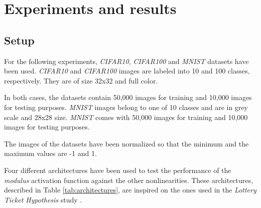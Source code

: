 \begin{itemize}
\end{itemize}

\section{Experiments and results} \label{sec:modulus_experiments}
\subsection{Setup}



For the following experiments, \textit{CIFAR10}, \textit{CIFAR100} \autocite{krizhevsky09} and \textit{MNIST} \autocite{lecun2010} datasets have been used. \textit{CIFAR10} and \textit{CIFAR100} images are labeled into 10 and 100 classes, respectively. They are of size 32x32 and full color. 

In both cases, the datasets contain 50,000 images for training and 10,000 images for testing purposes. \textit{MNIST} images belong to one of 10 classes and are in grey scale and 28x28 size. \textit{MNIST} comes with 50,000 images for training and 10,000 images for testing purposes.

The images of the datasets have been normalized so that the minimum and the maximum values are -1 and 1. 

Four different architectures have been used to test the performance of the \textit{modulus} activation function against the other nonlinearities. These architectures, described in Table \ref{tab:architectures}, are inspired on the ones used in the \textit{Lottery Ticket Hypothesis} study \autocite{frankleC19}.


